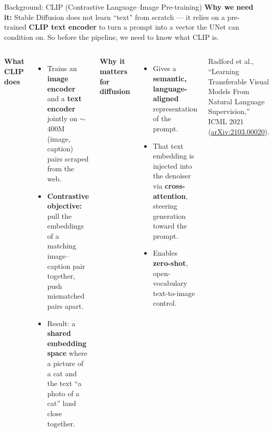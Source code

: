 \begin{frame}{Background: CLIP (Contrastive Language--Image Pre-training)}
    \textbf{Why we need it:} Stable Diffusion does not learn ``text'' from scratch --- it
    relies on a pre-trained \textbf{CLIP text encoder} to turn a prompt into a vector the
    UNet can condition on. So before the pipeline, we need to know what CLIP is.

    \vspace{0.6em}
    \begin{columns}[T,onlytextwidth]
            \textbf{What CLIP does}
            \begin{itemize}\itemsep0.25em
                \item Trains an \textbf{image encoder} and a \textbf{text encoder} jointly on
                      $\sim$400M (image, caption) pairs scraped from the web.
                \item \textbf{Contrastive objective:} pull the embeddings of a matching
                      image--caption pair together, push mismatched pairs apart.
                \item Result: a \textbf{shared embedding space} where a picture of a cat and the
                      text ``a photo of a cat'' land close together.
            \end{itemize}
            \textbf{Why it matters for diffusion}
            \begin{itemize}\itemsep0.25em
                \item Gives a \textbf{semantic, language-aligned} representation of the prompt.
                \item That text embedding is injected into the denoiser via
                      \textbf{cross-attention}, steering generation toward the prompt.
                \item Enables \textbf{zero-shot}, open-vocabulary text-to-image control.
            \end{itemize}
            \vspace{0.4em}
            {\footnotesize Radford et al., ``Learning Transferable Visual Models From Natural
            Language Supervision,'' ICML 2021 (\href{https://arxiv.org/abs/2103.00020}{arXiv:2103.00020}).}
    \end{columns}
\end{frame}
